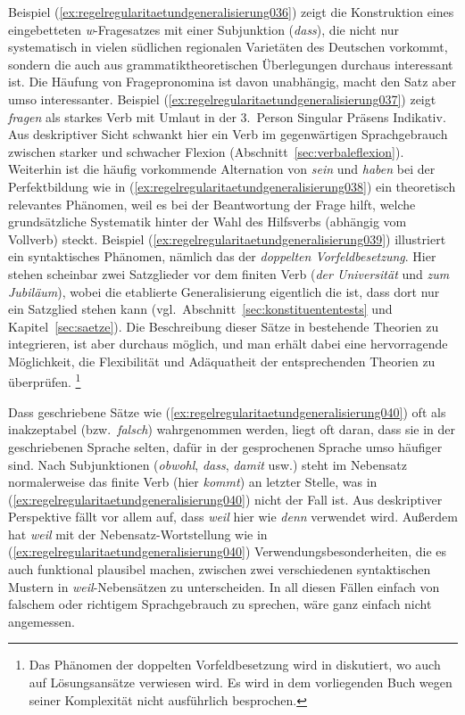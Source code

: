 Beispiel (\ref{ex:regelregularitaetundgeneralisierung036}) zeigt die Konstruktion eines eingebetteten \textit{w}-Fragesatzes mit einer Subjunktion (\textit{dass}), die nicht nur systematisch in vielen südlichen regionalen Varietäten des Deutschen vorkommt, sondern die auch aus grammatiktheoretischen Überlegungen durchaus interessant ist.
Die Häufung von Fragepronomina ist davon unabhängig, macht den Satz aber umso interessanter.
Beispiel (\ref{ex:regelregularitaetundgeneralisierung037}) zeigt \textit{fragen} als starkes Verb mit Umlaut in der 3.\ Person Singular Präsens Indikativ.
Aus deskriptiver Sicht schwankt hier ein Verb im gegenwärtigen Sprachgebrauch zwischen starker und schwacher Flexion (Abschnitt~\ref{sec:verbaleflexion}).
Weiterhin ist die häufig vorkommende Alternation von \textit{sein} und \textit{haben} bei der Perfektbildung wie in (\ref{ex:regelregularitaetundgeneralisierung038}) ein theoretisch relevantes Phänomen, weil es bei der Beantwortung der Frage hilft, welche grundsätzliche Systematik hinter der Wahl des Hilfsverbs (abhängig vom Vollverb) steckt.
Beispiel (\ref{ex:regelregularitaetundgeneralisierung039}) illustriert ein syntaktisches Phänomen, nämlich das der \textit{doppelten Vorfeldbesetzung}.
Hier stehen scheinbar zwei Satzglieder vor dem finiten Verb (\textit{der Universität} und \textit{zum Jubiläum}), wobei die etablierte Generalisierung eigentlich die ist, dass dort nur ein Satzglied stehen kann (vgl.\ Abschnitt~\ref{sec:konstituententests} und Kapitel~\ref{sec:saetze}).
Die Beschreibung dieser Sätze in bestehende Theorien zu integrieren, ist aber durchaus möglich, und man erhält dabei eine hervorragende Möglichkeit, die Flexibilität und Adäquatheit der entsprechenden Theorien zu überprüfen.%
\footnote{Das Phänomen der doppelten Vorfeldbesetzung wird in \citet{Mueller2003} diskutiert, wo auch auf Lösungsansätze verwiesen wird.
Es wird in dem vorliegenden Buch wegen seiner Komplexität nicht ausführlich besprochen.}

Dass geschriebene Sätze wie (\ref{ex:regelregularitaetundgeneralisierung040}) oft als inakzeptabel (bzw.\ \textit{falsch}) wahrgenommen werden, liegt oft daran, dass sie in der geschriebenen Sprache selten, dafür in der gesprochenen Sprache umso häufiger sind.
Nach Subjunktionen (\textit{obwohl}, \textit{dass}, \textit{damit} usw.) steht im Nebensatz normalerweise das finite Verb (hier \textit{kommt}) an letzter Stelle, was in (\ref{ex:regelregularitaetundgeneralisierung040}) nicht der Fall ist.
Aus deskriptiver Perspektive fällt vor allem auf, dass \textit{weil} hier wie \textit{denn} verwendet wird.
Außerdem hat \textit{weil} mit der Nebensatz-Wortstellung wie in (\ref{ex:regelregularitaetundgeneralisierung040}) Verwendungsbesonderheiten, die es auch funktional plausibel machen, zwischen zwei verschiedenen syntaktischen Mustern in \textit{weil}-Nebensätzen zu unterscheiden.
In all diesen Fällen einfach von falschem oder richtigem Sprachgebrauch zu sprechen, wäre ganz einfach nicht angemessen.

